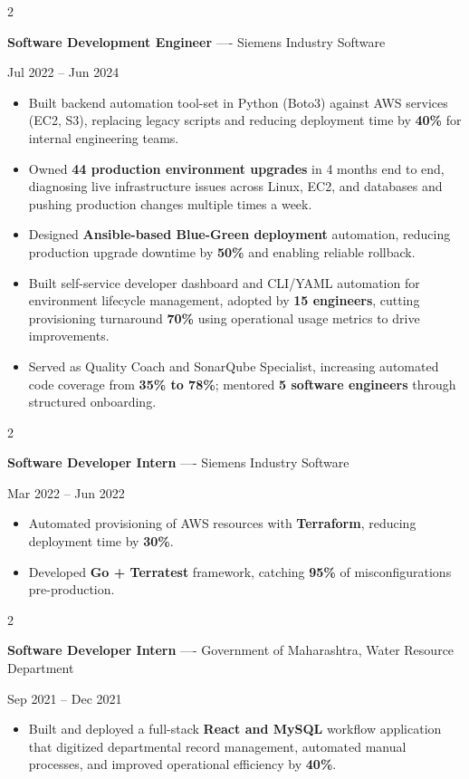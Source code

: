 \documentclass[10pt, letterpaper]{article}
\newenvironment{highlights}{
    \begin{itemize}[
        topsep=0.10 cm,
        parsep=0.06 cm,
        partopsep=0pt,
        itemsep=0.06 cm,
        leftmargin=12pt
    ]
}{
    \end{itemize}
}
\newenvironment{twocolentry}[2][]{
    \onecolentry
    \def\secondColumn{#2}
    \setcolumnwidth{\fill, 4.5 cm}
    \begin{paracol}{2}
}{
    \switchcolumn \raggedleft \secondColumn
    \end{paracol}
    \endonecolentry
}
\begin{document}
\vspace{0.15 cm}

\begin{twocolentry}{Jul 2022 -- Jun 2024}
\textbf{Software Development Engineer} ---- Siemens Industry Software
\end{twocolentry}
\begin{highlights}
  \item Built backend automation tool-set in Python (Boto3) against AWS services (EC2, S3), replacing legacy scripts and reducing deployment time by \textbf{40\%} for internal engineering teams.
  \item Owned \textbf{44 production environment upgrades} in 4 months end to end, diagnosing live infrastructure issues across Linux, EC2, and databases and pushing production changes multiple times a week.
  \item Designed \textbf{Ansible-based Blue-Green deployment} automation, reducing production upgrade downtime by \textbf{50\%} and enabling reliable rollback.
  \item Built self-service developer dashboard and CLI/YAML automation for environment lifecycle management, adopted by \textbf{15 engineers}, cutting provisioning turnaround \textbf{70\%} using operational usage metrics to drive improvements.
  \item Served as Quality Coach and SonarQube Specialist, increasing automated code coverage from \textbf{35\% to 78\%}; mentored \textbf{5 software engineers} through structured onboarding.
\end{highlights}

\vspace{0.15 cm}

\begin{twocolentry}{Mar 2022 -- Jun 2022}
\textbf{Software Developer Intern} ---- Siemens Industry Software
\end{twocolentry}
\begin{highlights}
  \item Automated provisioning of AWS resources with \textbf{Terraform}, reducing deployment time by \textbf{30\%}.
  \item Developed \textbf{Go + Terratest} framework, catching \textbf{95\%} of misconfigurations pre-production.
\end{highlights}

\vspace{0.15 cm}

\begin{twocolentry}{Sep 2021 -- Dec 2021}
\textbf{Software Developer Intern} ---- Government of Maharashtra, Water Resource Department
\end{twocolentry}
\begin{highlights}
  \item Built and deployed a full-stack \textbf{React and MySQL} workflow application that digitized departmental record management, automated manual processes, and improved operational efficiency by \textbf{40\%}.
\end{highlights}
\end{document}
